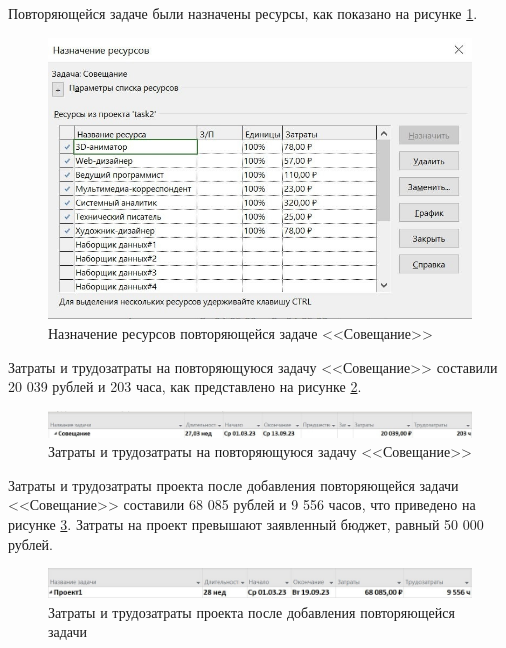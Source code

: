 Повторяющейся задаче были назначены ресурсы, как показано на рисунке \ref{img:task2-resources}.

\begin{figure}[H]
	\begin{center}
		\includegraphics[scale=0.25]{inc/img/task2-resources.jpg}
	\end{center}
	\captionsetup{justification=centering}
	\caption{Назначение ресурсов повторяющейся задаче <<Совещание>>}
	\label{img:task2-resources}
\end{figure}

Затраты и трудозатраты на повторяющуюся задачу <<Совещание>> составили 20 039 рублей и 203 часа, как представлено на рисунке \ref{img:task2-meeting-costs}.

\begin{figure}[H]
	\begin{center}
		\includegraphics[scale=0.3]{inc/img/task2-meeting-costs.jpg}
	\end{center}
	\captionsetup{justification=centering}
	\caption{Затраты и трудозатраты на повторяющуюся задачу <<Совещание>>}
	\label{img:task2-meeting-costs}
\end{figure}

Затраты и трудозатраты проекта после добавления повторяющейся задачи <<Совещание>> составили 68 085 рублей и 9 556 часов, что приведено на рисунке \ref{img:task2-meeting-budget}. Затраты на проект превышают заявленный бюджет, равный 50 000 рублей.

\begin{figure}[H]
	\begin{center}
		\includegraphics[scale=0.3]{inc/img/task2-meeting-budget.jpg}
	\end{center}
	\captionsetup{justification=centering}
	\caption{Затраты и трудозатраты проекта после добавления повторяющейся задачи}
	\label{img:task2-meeting-budget}
\end{figure}

